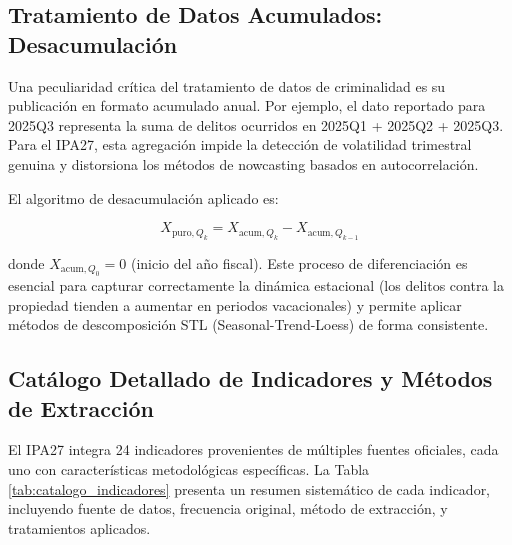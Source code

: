 \documentclass[authoryear,12pt]{elsarticle}
\begin{document}
\subsection{Tratamiento de Datos Acumulados: Desacumulación}

Una peculiaridad crítica del tratamiento de datos de criminalidad es su publicación en formato acumulado anual. Por ejemplo, el dato reportado para 2025Q3 representa la suma de delitos ocurridos en 2025Q1 + 2025Q2 + 2025Q3. Para el IPA27, esta agregación impide la detección de volatilidad trimestral genuina y distorsiona los métodos de nowcasting basados en autocorrelación.

El algoritmo de desacumulación aplicado es:

\begin{equation}
X_{\text{puro}, Q_k} = X_{\text{acum}, Q_k} - X_{\text{acum}, Q_{k-1}}
\end{equation}

donde $X_{\text{acum}, Q_0} = 0$ (inicio del año fiscal). Este proceso de diferenciación es esencial para capturar correctamente la dinámica estacional (los delitos contra la propiedad tienden a aumentar en periodos vacacionales) y permite aplicar métodos de descomposición STL (Seasonal-Trend-Loess) de forma consistente.

\subsection{Catálogo Detallado de Indicadores y Métodos de Extracción}

El IPA27 integra 24 indicadores provenientes de múltiples fuentes oficiales, cada uno con características metodológicas específicas. La Tabla \ref{tab:catalogo_indicadores} presenta un resumen sistemático de cada indicador, incluyendo fuente de datos, frecuencia original, método de extracción, y tratamientos aplicados.
\end{document}
